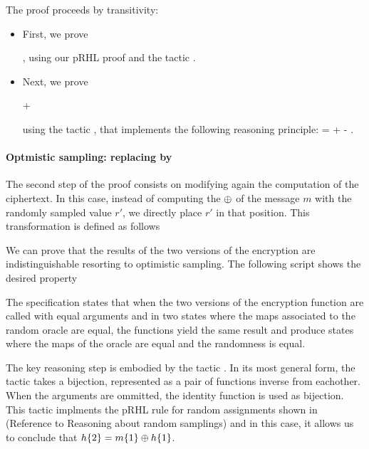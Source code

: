 
The proof proceeds by transitivity:
\begin{itemize}
\item First, we prove 

,
using our pRHL proof and the tactic .

\item Next, we prove


 +


using the tactic , that implements the following reasoning
principle:
 =   +  - .
 
\end{itemize}

\paragraph{Optmistic sampling: replacing  by }
The second step of the proof consists on modifying again the
computation of the ciphertext. In this case, instead of computing the
$\oplus$ of the message $m$ with the randomly sampled value $r'$, we
directly place $r'$ in that position. This transformation is defined
as follows

We can prove that the results of the two versions of the encryption
are indistinguishable resorting to optimistic sampling. The following
\EC script shows the desired property


The specification states that when the two versions of the encryption
function are called with equal arguments and in two states where the
maps associated to the random oracle are equal, the functions yield
the same result and produce states where the maps of the oracle are
equal and the randomness is equal.  

The key reasoning step is embodied by the tactic . In its most general form, the 
tactic takes a bijection, represented as a pair of functions inverse
from eachother. When the arguments are ommitted, the identity function
is used as bijection. This tactic implments the pRHL rule for random
assignments shown in (Reference to Reasoning about random samplings)
and in this case, it allows us to conclude that ${h\{2\} = m\{1\} \oplus
  h\{1\}}$.

